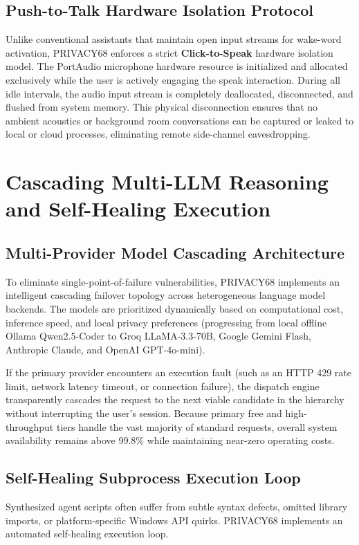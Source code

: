 \documentclass[conference]{IEEEtran}
\begin{document}
\subsection{Push-to-Talk Hardware Isolation Protocol}
Unlike conventional assistants that maintain open input streams for wake-word activation, PRIVACY68 enforces a strict \textbf{Click-to-Speak} hardware isolation model. The PortAudio microphone hardware resource is initialized and allocated exclusively while the user is actively engaging the speak interaction. During all idle intervals, the audio input stream is completely deallocated, disconnected, and flushed from system memory. This physical disconnection ensures that no ambient acoustics or background room conversations can be captured or leaked to local or cloud processes, eliminating remote side-channel eavesdropping.

\section{Cascading Multi-LLM Reasoning and Self-Healing Execution}
\label{sec:brain}

\subsection{Multi-Provider Model Cascading Architecture}
To eliminate single-point-of-failure vulnerabilities, PRIVACY68 implements an intelligent cascading failover topology across heterogeneous language model backends. The models are prioritized dynamically based on computational cost, inference speed, and local privacy preferences (progressing from local offline Ollama Qwen2.5-Coder to Groq LLaMA-3.3-70B, Google Gemini Flash, Anthropic Claude, and OpenAI GPT-4o-mini).

If the primary provider encounters an execution fault (such as an HTTP 429 rate limit, network latency timeout, or connection failure), the dispatch engine transparently cascades the request to the next viable candidate in the hierarchy without interrupting the user's session. Because primary free and high-throughput tiers handle the vast majority of standard requests, overall system availability remains above 99.8\% while maintaining near-zero operating costs.

\subsection{Self-Healing Subprocess Execution Loop}
Synthesized agent scripts often suffer from subtle syntax defects, omitted library imports, or platform-specific Windows API quirks. PRIVACY68 implements an automated self-healing execution loop.
\end{document}
